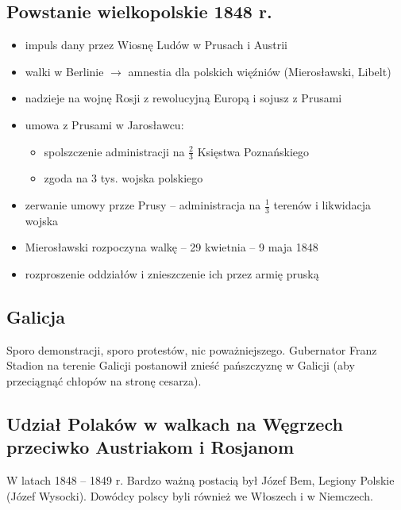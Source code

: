 \documentclass [a4paper, 11pt, oneside]{book}
\begin{document}
        \subsection{Powstanie wielkopolskie 1848 r.} %
        \label{sub:powstanie_wielkopolskie_1848_r_}
            \begin{itemize}
                \item impuls dany przez Wiosnę Ludów w Prusach i Austrii
                \item walki w Berlinie $\rightarrow$ amnestia dla polskich więźniów (Mierosławski, Libelt)
                \item nadzieje na wojnę Rosji z rewolucyjną Europą i sojusz z Prusami
                \item umowa z Prusami w Jarosławcu:
                \begin{itemize}
                    \item spolszczenie administracji na $\frac23$ Księstwa Poznańskiego
                    \item zgoda na 3 tys. wojska polskiego
                \end{itemize}
                \item zerwanie umowy przze Prusy -- administracja na $\frac13$ terenów i likwidacja wojska
                \item Mierosławski rozpoczyna walkę -- 29 kwietnia -- 9 maja 1848
                \item rozproszenie oddziałów i znieszczenie ich przez armię pruską
            \end{itemize}
        \subsection{Galicja} %
        \label{sub:galicja}
            Sporo demonstracji, sporo protestów, nic poważniejszego. Gubernator Franz Stadion na terenie Galicji postanowił znieść pańszczyznę w Galicji (aby przeciągnąć chłopów na stronę cesarza).
        \subsection{Udział Polaków w walkach na Węgrzech przeciwko Austriakom i Rosjanom} %
        \label{sub:udzia_polak_w_w_walkach_na_w_grzech_przeciwko_austriakom_i_rosjanom}
            W latach 1848 -- 1849 r. Bardzo ważną postacią był Józef Bem, Legiony Polskie (Józef Wysocki). Dowódcy polscy byli również we Włoszech i w Niemczech.
\end{document}
